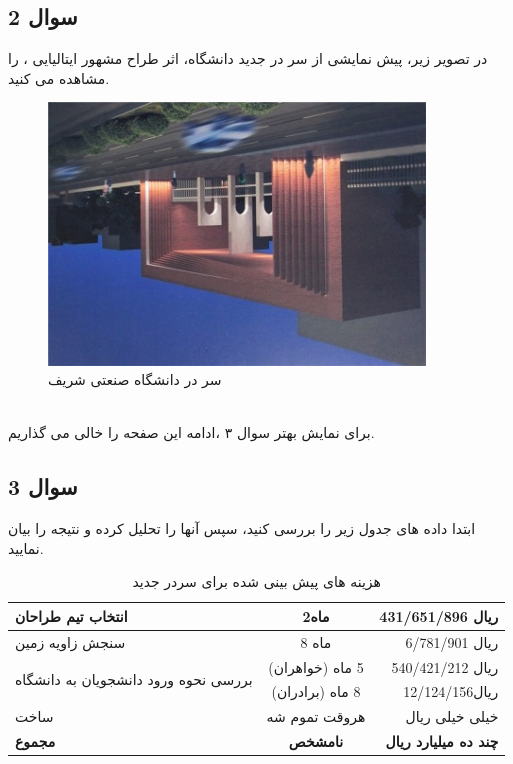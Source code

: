 \documentclass[twoside]{article}
\newcommand{\نام}{محمدعرفان سلیما}
\newcommand{\گروه}{2}
\begin{document}
\subsection*{سوال 2}
در تصویر زیر، پیش نمایشی از سر در جدید دانشگاه، اثر طراح مشهور ایتالیایی ، را 
مشاهده می کنید.
\begin{figure}[h]
    \centering
    \includegraphics[width=100mm,angle=180]{sharif-door}
    \caption{سر در دانشگاه صنعتی شریف}
    
\end{figure}\\
برای نمایش بهتر سوال ۳ ،ادامه این صفحه را خالی می گذاریم.

\newpage
\subsection*{سوال 3}
ابتدا داده های جدول زیر را بررسی کنید، سپس آنها را تحلیل کرده و نتیجه را بیان نمایید.
\renewcommand{\arraystretch}{1.5}
\begin{table}[h!]
\centering
\begin{tabular}{|l|c|r|} 
 \hline
 انتخاب تیم طراحان&2ماه & 431/651/896 ریال \\
 \hline
 سنجش زاویه زمین &8 ماه & 6/781/901 ریال  \\ 
 \hline
 \multirow{2}{*}{بررسی نحوه ورود دانشجویان به دانشگاه}
 &(خواهران) 5 ماه&540/421/212 ریال
\\ \cline{2-3}
&(برادران) 8 ماه & 12/124/156ریال \\
 \hline
 ساخت & هروقت تموم شه & خیلی خیلی ریال\\
 \hline\hline
\textbf{مجموع}& \textbf{نامشخص}&\textbf{چند ده میلیارد ریال}\\
 \hline
\end{tabular}
\caption{هزینه های پیش بینی شده برای سردر جدید}

\end{table}
\end{document}
